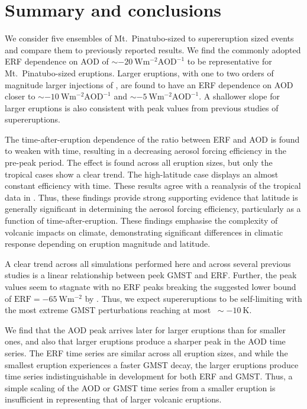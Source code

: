 \documentclass[draft]{agujournal2019}
\begin{document}
  \section{Summary and conclusions}

  \label{sec:conclusions}

  We consider five ensembles of Mt.\ Pinatubo-sized to supereruption sized events and
  compare them to previously reported results. We find the commonly adopted ERF
  dependence on AOD of \(\sim\SI{-20}{\watt\metre^{-2}\mathrm{AOD}^{-1}}\) to be
  representative for Mt.\
  Pinatubo-sized eruptions. Larger eruptions, with one to two orders of magnitude larger
  injections of \ce{SO2}, are found to have an ERF dependence on AOD closer to
  \(\sim\SI{-10}{\watt\metre^{-2}\mathrm{AOD}^{-1}}\) and
  \(\sim\SI{-5}{\watt\metre^{-2}\mathrm{AOD}^{-1}}\). A shallower slope for larger
  eruptions is also consistent with peak values from previous studies of supereruptions.

  The time-after-eruption dependence of the ratio between ERF and AOD is found to weaken
  with time, resulting in a decreasing aerosol forcing efficiency in the pre-peak
  period. The effect is found across all eruption sizes, but only the tropical cases
  show a clear trend. The high-latitude case displays an almost constant efficiency with
  time. These results agree with a reanalysis of the tropical data in
  \citeA{marshall2020dataset}. Thus, these findings provide strong supporting evidence
  that latitude is generally significant in determining the aerosol forcing efficiency,
  particularly as a function of time-after-eruption. These findings emphasise the
  complexity of volcanic impacts on climate, demonstrating significant differences in
  climatic response depending on eruption magnitude and latitude.

  A clear trend across all simulations performed here and across several previous
  studies is a linear relationship between peek GMST and ERF. Further, the peak values
  seem to stagnate with no ERF peaks breaking the suggested lower bound of
  \(\text{ERF}=\SI{-65}{\watt\metre^{-2}}\) by \citeA{niemeier2015}. Thus, we expect
  supereruptions to be self-limiting with the most extreme GMST perturbations reaching
  at most \(~\sim \SI{-10}{\kelvin}\).

  We find that the AOD peak arrives later for larger eruptions than for smaller ones,
  and also that larger eruptions produce a sharper peak in the AOD time series. The ERF
  time series are similar across all eruption sizes, and while the smallest eruption
  experiences a faster GMST decay, the larger eruptions produce time series
  indistinguishable in development for both ERF and GMST. Thus, a simple scaling of the
  AOD or GMST time series from a smaller eruption is insufficient in representing that
  of larger volcanic eruptions.
\end{document}
